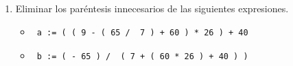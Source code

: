 \documentclass[a4paper,10pt]{article}
\begin{document}
~\\ \\ \\ \\

\begin{enumerate}

\item Eliminar los par\'entesis innecesarios de las siguientes expresiones.
    \begin{itemize}
        \item[a-] \begin{verbatim} a := ( ( 9 - ( 65 /  7 ) + 60 ) * 26 ) + 40 \end{verbatim}
        \item[b-] \begin{verbatim} b := ( - 65 ) /  ( 7 + ( 60 * 26 ) + 40 ) )\end{verbatim}
    \end{itemize}


\end{enumerate}
\end{document}
